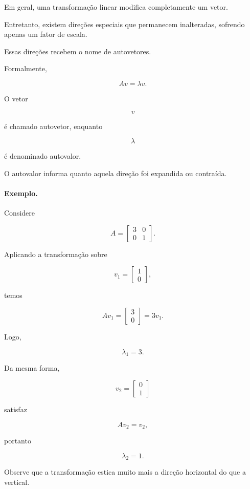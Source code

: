 \documentclass[12pt, a4paper]{article}
\begin{document}
Em geral, uma transformação linear modifica completamente um vetor.

Entretanto, existem direções especiais que permanecem inalteradas,
sofrendo apenas um fator de escala.

Essas direções recebem o nome de autovetores.

Formalmente,

\[
Av=\lambda v.
\]

O vetor

\[
v
\]

é chamado autovetor, enquanto

\[
\lambda
\]

é denominado autovalor.

O autovalor informa quanto aquela direção foi expandida ou contraída.

\paragraph{Exemplo.}

Considere

\[
A=
\begin{bmatrix}
3&0\\
0&1
\end{bmatrix}.
\]

Aplicando a transformação sobre

\[
v_1=
\begin{bmatrix}
1\\
0
\end{bmatrix},
\]

temos

\[
Av_1=
\begin{bmatrix}
3\\
0
\end{bmatrix}
=
3v_1.
\]

Logo,

\[
\lambda_1=3.
\]

Da mesma forma,

\[
v_2=
\begin{bmatrix}
0\\
1
\end{bmatrix}
\]

satisfaz

\[
Av_2=v_2,
\]

portanto

\[
\lambda_2=1.
\]

Observe que a transformação estica muito mais a direção horizontal do que
a vertical.
\end{document}
